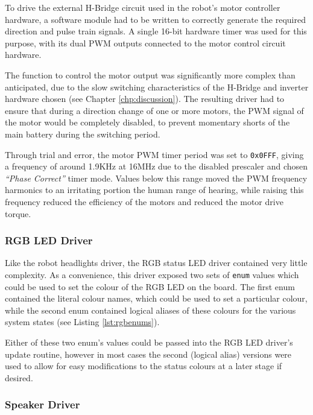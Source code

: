 To drive the external H-Bridge circuit used in the robot's motor controller hardware, a software module had to be written to correctly generate the required direction and pulse train signals. A single 16-bit hardware timer was used for this purpose, with its dual PWM outputs connected to the motor control circuit hardware.

The function to control the motor output was significantly more complex than anticipated, due to the slow switching characteristics of the H-Bridge and inverter hardware chosen (see Chapter \ref{chp:discussion}). The resulting driver had to ensure that during a direction change of one or more motors, the PWM signal of the motor would be completely disabled, to prevent momentary shorts of the main battery during the switching period.

Through trial and error, the motor PWM timer period was set to \lstinline{0x0FFF}, giving a frequency of around 1.9KHz at 16MHz due to the disabled prescaler and chosen \textit{``Phase Correct''} timer mode. Values below this range moved the PWM frequency harmonics to an irritating portion the human range of hearing, while raising this frequency reduced the efficiency of the motors and reduced the motor drive torque.

\FloatBarrier
\subsubsection{RGB LED Driver}

Like the robot headlights driver, the RGB status LED driver contained very little complexity. As a convenience, this driver exposed two sets of \lstinline{enum} values which could be used to set the colour of the RGB LED on the board. The first enum contained the literal colour names, which could be used to set a particular colour, while the second enum contained logical aliases of these colours for the various system states (see Listing \ref{lst:rgbenums}).



Either of these two enum's values could be passed into the RGB LED driver's update routine, however in most cases the second (logical alias) versions were used to allow for easy modifications to the status colours at a later stage if desired.

\FloatBarrier
\subsubsection{Speaker Driver}

